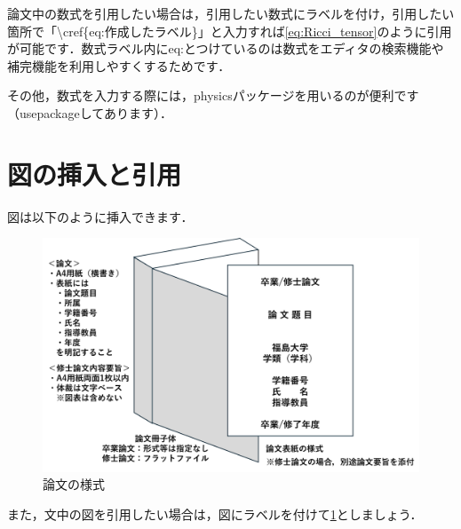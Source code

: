	論文中の数式を引用したい場合は，引用したい数式にラベルを付け，引用したい箇所で「\textbackslash cref\{eq:作成したラベル\}」と入力すれば\cref{eq:Ricci_tensor}のように引用が可能です．数式ラベル内にeq:とつけているのは数式をエディタの検索機能や補完機能を利用しやすくするためです．

	その他，数式を入力する際には，physicsパッケージを用いるのが便利です（usepackageしてあります）．

	\section{図の挿入と引用}
	図は以下のように挿入できます．
		\begin{figure}[htbp]
			\centering
			\includegraphics[width=1.0\linewidth,keepaspectratio]{./images/論文様式.png}
			\caption{論文の様式}
			\label{fig:overview}
		\end{figure}

	また，文中の図を引用したい場合は，図にラベルを付けて\cref{fig:overview}としましょう．
